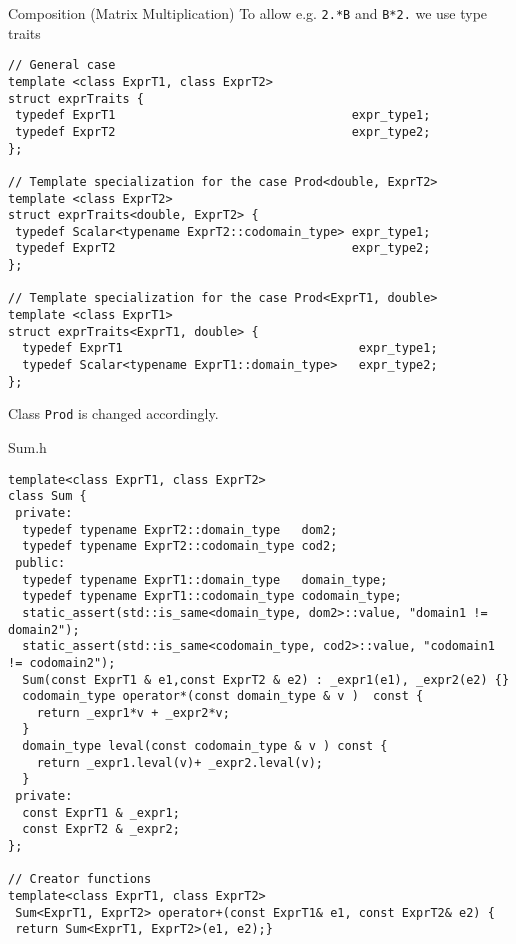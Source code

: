 \documentclass[9pt]{beamer}
\begin{document}
\begin{frame}[fragile]{Composition (Matrix Multiplication)}
To allow e.g. \lstinline|2.*B| and \lstinline|B*2.| we use type traits

\begin{lstlisting}
// General case
template <class ExprT1, class ExprT2>
struct exprTraits {
 typedef ExprT1                                 expr_type1;
 typedef ExprT2                                 expr_type2;
};

// Template specialization for the case Prod<double, ExprT2>
template <class ExprT2>
struct exprTraits<double, ExprT2> {
 typedef Scalar<typename ExprT2::codomain_type> expr_type1;
 typedef ExprT2                                 expr_type2;
};

// Template specialization for the case Prod<ExprT1, double>
template <class ExprT1>
struct exprTraits<ExprT1, double> {
  typedef ExprT1                                 expr_type1;
  typedef Scalar<typename ExprT1::domain_type>   expr_type2;
};
\end{lstlisting}

Class \lstinline|Prod| is changed accordingly.
\pause


\end{frame}


\begin{frame}[fragile]{Sum.h} %
\begin{lstlisting}
template<class ExprT1, class ExprT2>
class Sum {
 private:
  typedef typename ExprT2::domain_type   dom2;
  typedef typename ExprT2::codomain_type cod2;
 public:
  typedef typename ExprT1::domain_type   domain_type;
  typedef typename ExprT1::codomain_type codomain_type;
  static_assert(std::is_same<domain_type, dom2>::value, "domain1 != domain2");
  static_assert(std::is_same<codomain_type, cod2>::value, "codomain1 != codomain2");
  Sum(const ExprT1 & e1,const ExprT2 & e2) : _expr1(e1), _expr2(e2) {}
  codomain_type operator*(const domain_type & v )  const {
    return _expr1*v + _expr2*v;
  }
  domain_type leval(const codomain_type & v ) const {
    return _expr1.leval(v)+ _expr2.leval(v);
  }
 private:
  const ExprT1 & _expr1;
  const ExprT2 & _expr2;
};

// Creator functions
template<class ExprT1, class ExprT2>
 Sum<ExprT1, ExprT2> operator+(const ExprT1& e1, const ExprT2& e2) {
 return Sum<ExprT1, ExprT2>(e1, e2);}

\end{lstlisting}
\end{frame}
\end{document}
